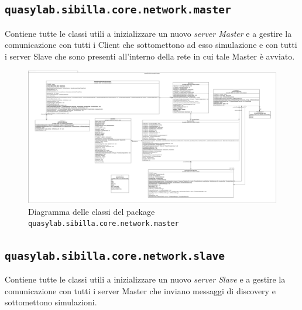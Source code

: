 \subsection{\texttt{quasylab.sibilla.core.network.master}} Contiene tutte le classi utili a inizializzare un nuovo \emph{server Master} e a gestire la comunicazione con tutti i Client che sottomettono ad esso simulazione e con tutti i server Slave che sono presenti all’interno della rete in cui tale Master è avviato.

\begin{figure}[H]
    \includegraphics[width=\linewidth]{images/quasylab.sibilla.core.network.master.png}
    \captionsetup{justification=centering}
    \caption{Diagramma delle classi del package \texttt{quasylab.sibilla.core.network.master}}
  \end{figure}

\subsection{\texttt{quasylab.sibilla.core.network.slave}} Contiene tutte le classi utili a inizializzare un nuovo \emph{server Slave} e a gestire la comunicazione con tutti i server Master che inviano messaggi di discovery e sottomettono simulazioni.


